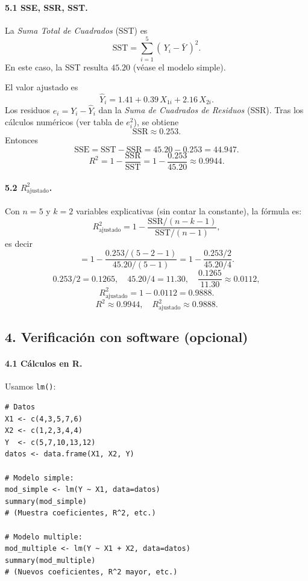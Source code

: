 \documentclass[10pt,a4paper]{article}
\begin{document}
\begin{enumerate}
\paragraph{5.1 SSE, SSR, SST.}

La \emph{Suma Total de Cuadrados} (SST) es
\[
\text{SST}
= \sum_{i=1}^5 (\,Y_i - \bar{Y}\,)^2.
\]
En este caso, la SST resulta $45.20$ (véase el modelo simple).  

El valor ajustado es
\[
\hat{Y}_i
= 1.41 + 0.39\,X_{1i} + 2.16\,X_{2i}.
\]
Los residuos $e_i=Y_i-\hat{Y}_i$ dan la \emph{Suma de Cuadrados de Residuos} (SSR). Tras los cálculos numéricos (ver tabla de $e_i^2$), se obtiene
\[
\text{SSR} \approx 0.253.
\]
Entonces
\[
\text{SSE}
= \text{SST} - \text{SSR}
= 45.20 - 0.253
= 44.947.
\]
\[
R^2
= 1-\frac{\text{SSR}}{\text{SST}}
= 1 - \frac{0.253}{45.20}
\approx 0.9944.
\]

\paragraph{5.2 $R_{\text{ajustado}}^2$.}

Con $n=5$ y $k=2$ variables explicativas (sin contar la constante), la fórmula es:
\[
R_{\text{ajustado}}^2
= 1
- 
\frac{\text{SSR}/(n-k-1)}{\text{SST}/(n-1)},
\]
es decir
\[
= 1
- 
\frac{0.253/(5-2-1)}{45.20/(5-1)}
= 1
- 
\frac{0.253/2}{45.20/4}.
\]
\[
0.253/2 = 0.1265,
\quad
45.20/4=11.30,
\quad
\frac{0.1265}{11.30}\approx 0.0112,
\]
\[
R_{\text{ajustado}}^2
= 1-0.0112
= 0.9888.
\]
\[
\boxed{
R^2 \approx 0.9944,
\quad
R_{\text{ajustado}}^2 \approx 0.9888.
}
\]



\subsection*{4. Verificaci\'on con software (opcional)}

\paragraph{4.1 C\'alculos en R.} Usamos \texttt{lm()}:

\begin{lstlisting}
# Datos
X1 <- c(4,3,5,7,6)
X2 <- c(1,2,3,4,4)
Y  <- c(5,7,10,13,12)
datos <- data.frame(X1, X2, Y)

# Modelo simple:
mod_simple <- lm(Y ~ X1, data=datos)
summary(mod_simple)
# (Muestra coeficientes, R^2, etc.)

# Modelo multiple:
mod_multiple <- lm(Y ~ X1 + X2, data=datos)
summary(mod_multiple)
# (Nuevos coeficientes, R^2 mayor, etc.)
\end{lstlisting}



\end{enumerate}
\end{document}
